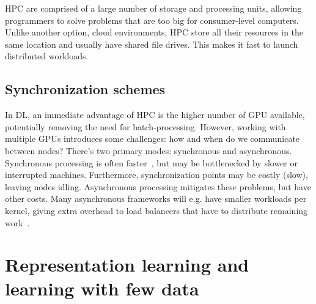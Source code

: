 \documentclass[10pt,twocolumn,letterpaper]{article}
\begin{document}
\gls{HPC} are comprised of a large number of storage and processing units, allowing programmers to solve problems that are too big for consumer-level computers. Unlike another option, cloud environments, \gls{HPC} store all their resources in the same location and usually have shared file drives. This makes it fast to launch distributed workloads. %

\subsection{Synchronization schemes}
In \gls{DL}, an immediate advantage of \gls{HPC} is the higher number of \gls{GPU} available, potentially removing the need for batch-processing. However, working with multiple \gls{GPU}s introduces some challenges: how and when do we communicate between nodes? There's two primary modes: synchronous and asynchronous. Synchronous processing is often faster~\cite{distributedDL}, but may be bottlenecked by slower or interrupted machines. Furthermore, synchronization points may be costly (slow), leaving nodes idling. Asynchronous processing mitigates these problems, but have other costs. Many asynchronous frameworks will e.g. have smaller workloads per kernel, giving extra overhead to load balancers that have to distribute remaining work~\cite{pan2017synchronous}.


\section{Representation learning and learning with few data}\label{sec:cheese}

\end{document}
